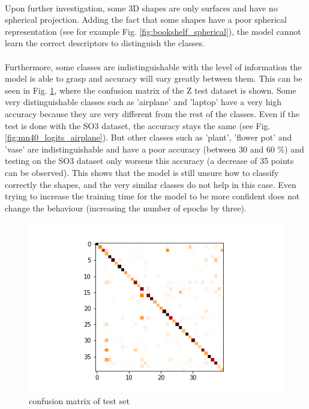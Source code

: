 \documentclass[11pt]{report}
\begin{document}
\paragraph*{}
Upon further investigation, some 3D shapes are only surfaces and have no spherical projection. Adding the fact that some shapes have a poor spherical representation (see for example Fig. \ref{fig:bookshelf_spherical}), the model cannot learn the correct descriptors to distinguish the classes.
\paragraph*{}
Furthermore, some classes are indistinguishable with the level of information the model is able to grasp and accuracy will vary greatly between them. This can be seen in Fig. \ref{fig:mn40_conf_matrix}, where the confusion matrix of the Z test dataset is shown. 
Some very distinguishable classes such as 'airplane' and 'laptop' have a very high accuracy because they are very different from the rest of the classes. Even if the test is done with the SO3 dataset, the accuracy stays the same (see Fig. \ref{fig:mn40_logits_airplane}). But other classes such as 'plant', 'flower pot' and 'vase' are indistinguishable and have a poor accuracy (between 30 and 60 \%) and testing on the SO3 dataset only worsens this accuracy (a decrease of 35 points can be observed). This shows that the model is still unsure how to classify correctly the shapes, and the very similar classes do not help in this case. Even trying to increase the training time for the model to be more confident does not change the behaviour (increasing the number of epochs by three).

\begin{figure}[!ht]
    \centering
    \includegraphics[width=0.7\linewidth]{figures/conf_matrix.png}
    \caption{confusion matrix of test set}
    \label{fig:mn40_conf_matrix}
\end{figure}
\end{document}
